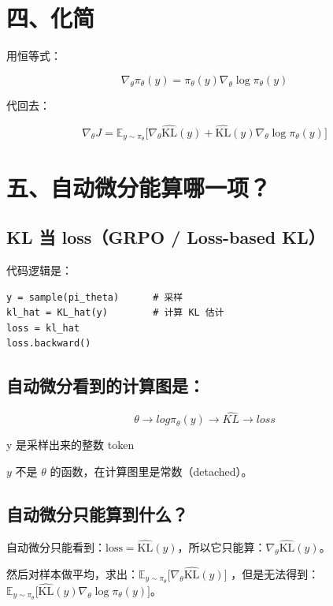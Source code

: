 \section{四、化简}

用恒等式：

\[
\nabla_\theta \pi_\theta(y) = \pi_\theta(y)\nabla_\theta \log \pi_\theta(y)
\]

代回去：

\[
\nabla_\theta J = \mathbb{E}_{y\sim\pi_\theta} \big[ \nabla_\theta \widehat{\mathrm{KL}}(y) + \widehat{\mathrm{KL}}(y)\nabla_\theta \log \pi_\theta(y) \big]
\]

\section{五、自动微分能算哪一项？}

\subsection{KL 当 loss（GRPO / Loss-based KL）}

代码逻辑是：

\begin{verbatim}
y = sample(pi_theta)      # 采样
kl_hat = KL_hat(y)        # 计算 KL 估计
loss = kl_hat
loss.backward()
\end{verbatim}

\subsection{自动微分看到的计算图是：}

\[
θ → log \pi_\theta (y) → \hat{KL} → loss
\]

\colorbox{mdc3}{\textcolor{mdc2}{y 是采样出来的整数 token}}

\(y\) 不是 \(\theta\) 的函数，在计算图里是常数（detached）。

\subsection{自动微分只能算到什么？}

自动微分只能看到：\(\text{loss} = \widehat{\mathrm{KL}}(y)\)，所以它只能算：\(\nabla_\theta \widehat{\mathrm{KL}}(y)\)。

\colorbox{mdc4}{\textcolor{mdc2}{然后对样本做平均，求出}}：\(\mathbb{E}_{y\sim\pi_\theta} \big[ \nabla_\theta \widehat{\mathrm{KL}}(y) \big]\) ，\colorbox{mdc5}{\textcolor{mdc2}{但是无法得到}}：\(\mathbb{E}_{y\sim\pi_\theta} \big[ \widehat{\mathrm{KL}}(y) \nabla_\theta \log \pi_\theta(y) \big]\)。

